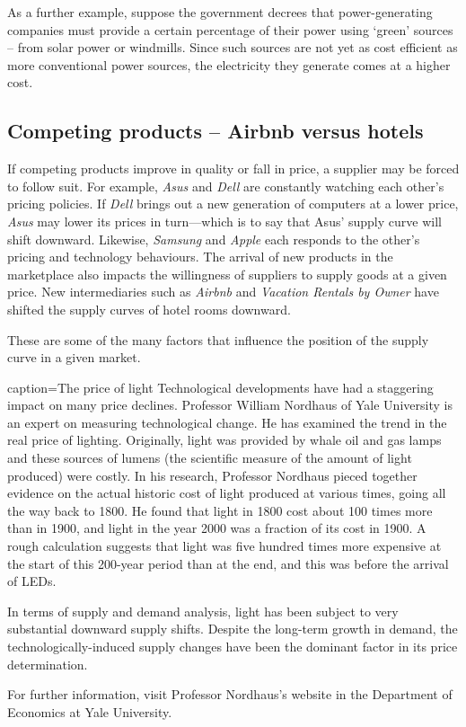 As a further example, suppose the government decrees that power-generating
companies must provide a certain percentage of their power using `green'
sources -- from solar power or windmills. Since such sources are not yet as
cost efficient as more conventional power sources, the electricity they
generate comes at a higher cost.

\newhtmlpage

\subsection*{Competing products -- Airbnb versus hotels}

If competing products improve in quality or fall in price, a supplier may be
forced to follow suit. For example, \textit{Asus} and \textit{Dell} are
constantly watching each other's pricing policies. If \textit{Dell} brings
out a new generation of computers at a lower price, \textit{Asus} may lower
its prices in turn---which is to say that Asus' supply curve will shift
downward. Likewise, \textit{Samsung} and \textit{Apple} each responds to the
other's pricing and technology behaviours. The arrival of new products in
the marketplace also impacts the willingness of suppliers to supply goods at
a given price. New intermediaries such as \textit{Airbnb} and
\textit{Vacation Rentals by Owner} have shifted the supply curves of hotel
rooms downward.

These are some of the many factors that influence the position of the supply
curve in a given market.

\begin{ApplicationBox}{caption={The price of light \label{app:pricelight}}}
Technological developments have had a staggering impact on many price declines. Professor William Nordhaus of Yale University is an expert on measuring technological change. He has examined the trend in the real price of lighting. Originally, light was provided by whale oil and gas lamps and these sources of lumens (the scientific measure of the amount of light produced) were costly. In his research, Professor Nordhaus pieced together evidence on the actual historic cost of light produced at various times, going all the way back to 1800. He found that light in 1800 cost about 100 times more than in 1900, and light in the year 2000 was a fraction of its cost in 1900. A rough calculation suggests that light was five hundred times more expensive at the start of this 200-year period than at the end, and this was before the arrival of LEDs.

In terms of supply and demand analysis, light has been subject to very substantial downward supply shifts. Despite the long-term growth in demand, the technologically-induced supply changes have been the dominant factor in its price determination.

For further information, visit Professor Nordhaus's website in the Department of Economics at Yale University.
\end{ApplicationBox}

